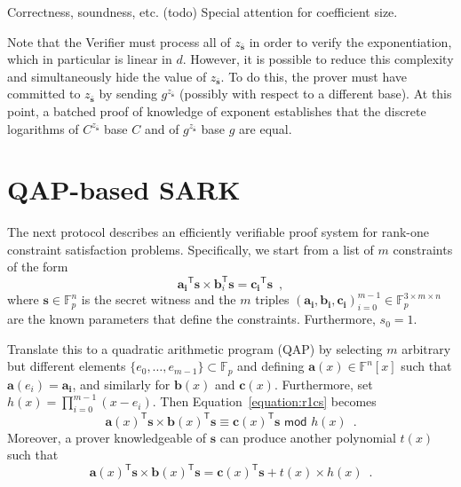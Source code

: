 \documentclass{article}
\begin{document}
Correctness, soundness, etc. (todo) Special attention for coefficient size.

Note that the Verifier must process all of $z_{\bar{\mathbf{s}}}$ in order to verify the exponentiation, which in particular is linear in $d$. However, it is possible to reduce this complexity and simultaneously hide the value of $z_{\bar{\mathbf{s}}}$. To do this, the prover must have committed to $z_{\bar{\mathbf{s}}}$ by sending $g^{z_{\bar{\mathbf{s}}}}$ (possibly with respect to a different base). At this point, a batched proof of knowledge of exponent establishes that the discrete logarithms of $C^{z_{\bar{\mathbf{s}}}}$ base $C$ and of $g^{z_{\bar{\mathbf{s}}}}$ base $g$ are equal.

\section{QAP-based SARK}

The next protocol describes an efficiently verifiable proof system for rank-one constraint satisfaction problems. Specifically, we start from a list of $m$ constraints of the form
\begin{equation} \label{equation:r1cs}
    \mathbf{a_i}^\mathsf{T} \mathbf{s} \times \mathbf{b}_i^\mathsf{T} \mathbf{s} = \mathbf{c_i}^\mathsf{T} \mathbf{s} \enspace ,
\end{equation}
where $\mathbf{s} \in \mathbb{F}_p^n$ is the secret witness and the $m$ triples $(\mathbf{a_i}, \mathbf{b_i}, \mathbf{c_i})_{i=0}^{m-1} \in \mathbb{F}_p^{3 \times m \times n}$ are the known parameters that define the constraints. Furthermore, $s_0 = 1$.

Translate this to a quadratic arithmetic program (QAP) by selecting $m$ arbitrary but different elements $\{e_0, \ldots, e_{m-1}\} \subset \mathbb{F}_p$ and defining $\mathbf{a}(x) \in \mathbb{F}^n[x]$ such that $\mathbf{a}(e_i) = \mathbf{a_i}$, and similarly for $\mathbf{b}(x)$ and $\mathbf{c}(x)$. Furthermore, set $h(x) = \prod_{i=0}^{m-1} (x-e_i)$. Then Equation~\ref{equation:r1cs} becomes
\begin{equation} \label{equation:qap_modular}
    \mathbf{a}(x)^\mathsf{T}\mathbf{s} \times \mathbf{b}(x)^\mathsf{T}\mathbf{s} \equiv \mathbf{c}(x)^\mathsf{T}\mathbf{s} \,\, \mathsf{mod} \,\, h(x) \enspace .
\end{equation}
Moreover, a prover knowledgeable of $\mathbf{s}$ can produce another polynomial $t(x)$ such that
\begin{equation} \label{equation:qap_explicit}
    \mathbf{a}(x)^\mathsf{T}\mathbf{s} \times \mathbf{b}(x)^\mathsf{T}\mathbf{s} = \mathbf{c}(x)^\mathsf{T}\mathbf{s} + t(x) \times h(x) \enspace .
\end{equation}
\end{document}
